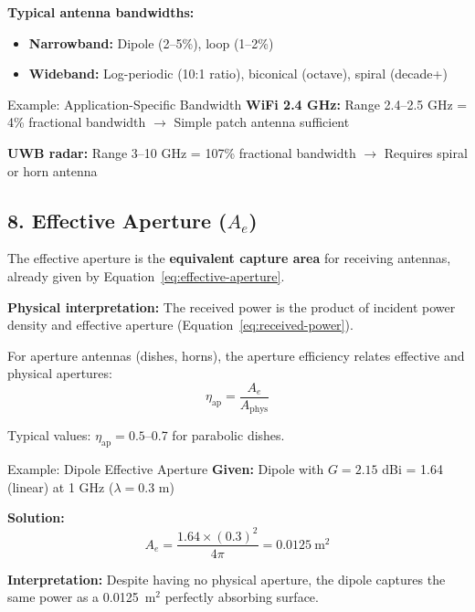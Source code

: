 \textbf{Typical antenna bandwidths:}
\begin{itemize}
\item \textbf{Narrowband:} Dipole (2--5\%), loop (1--2\%)
\item \textbf{Wideband:} Log-periodic (10:1 ratio), biconical (octave), spiral (decade+)
\end{itemize}

\begin{calloutbox}{Example: Application-Specific Bandwidth}
\textbf{WiFi 2.4 GHz:} Range 2.4--2.5 GHz = 4\% fractional bandwidth $\rightarrow$ Simple patch antenna sufficient

\textbf{UWB radar:} Range 3--10 GHz = 107\% fractional bandwidth $\rightarrow$ Requires spiral or horn antenna
\end{calloutbox}

\subsection{8. Effective Aperture ($A_e$)}

The effective aperture is the \textbf{equivalent capture area} for receiving antennas, already given by Equation~\ref{eq:effective-aperture}.

\textbf{Physical interpretation:} The received power is the product of incident power density and effective aperture (Equation~\ref{eq:received-power}).

For aperture antennas (dishes, horns), the aperture efficiency relates effective and physical apertures:
\begin{equation}
\eta_{\text{ap}} = \frac{A_e}{A_{\text{phys}}}
\label{eq:aperture-efficiency}
\end{equation}

Typical values: $\eta_{\text{ap}} = 0.5$--0.7 for parabolic dishes.

\begin{calloutbox}{Example: Dipole Effective Aperture}
\textbf{Given:} Dipole with $G = 2.15$ dBi = 1.64 (linear) at 1 GHz ($\lambda = 0.3$ m)

\textbf{Solution:}
\begin{equation}
A_e = \frac{1.64 \times (0.3)^2}{4\pi} = 0.0125\ \text{m}^2
\end{equation}

\textbf{Interpretation:} Despite having no physical aperture, the dipole captures the same power as a 0.0125~m$^2$ perfectly absorbing surface.
\end{calloutbox}

